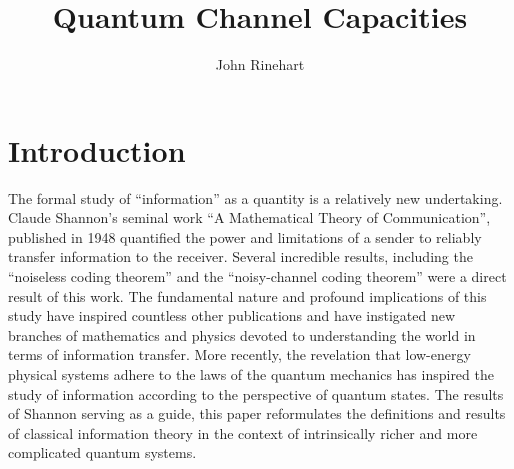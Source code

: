 \documentclass[letterpaper,twoside,10pt]{article}
\begin{document}
\pagestyle{empty} %



\title{Quantum Channel Capacities}
\author{John Rinehart}
\maketitle




\pagestyle{plain} %







\section{Introduction}
The formal study of ``information'' as a quantity is a relatively new undertaking. Claude Shannon's seminal work ``A Mathematical Theory of Communication'', published in 1948 quantified the power and limitations of a sender to reliably transfer information to the receiver. Several incredible results, including the ``noiseless coding theorem'' and the ``noisy-channel coding theorem'' were a direct result of this work. The fundamental nature and profound implications of this study have inspired countless other publications and have instigated new branches of mathematics and physics devoted to understanding the world in terms of information transfer. More recently, the revelation that low-energy physical systems adhere to the laws of the quantum mechanics has inspired the study of information according to the perspective of quantum states. The results of Shannon serving as a guide, this paper reformulates the definitions and results of classical information theory in the context of intrinsically richer and more complicated quantum systems.
\end{document}
